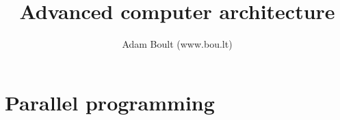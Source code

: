 \documentclass[oneside]{book}
\begin{document}
\author{Adam Boult (www.bou.lt)}
\title{Advanced computer architecture}
\maketitle

\setcounter{tocdepth}{0}
\tableofcontents



\part{Parallel programming}

\end{document}
